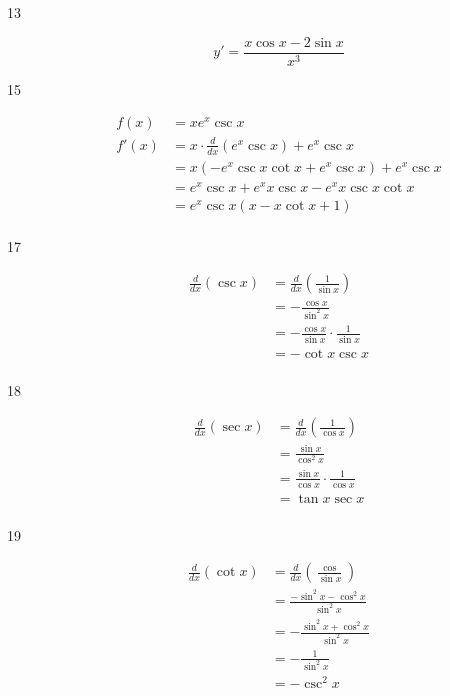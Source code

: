 \documentclass[letterpaper, landscape]{exam}
\begin{document}
\begin{description}
    \item[13] 
      \[
        y' = \boxed{ \frac{x \cos x - 2 \sin x}{x^3} }
      \]

    \item[15] 
      \begin{align*}
        f(x)  & = x e^x \csc x \\
        f'(x) & = x \cdot \frac{d}{dx} \left( e^x \csc x \right) + e^x \csc x \\
              & = x \left( - e^x \csc x \cot x + e^x \csc x  \right)+ e^x \csc x \\
              & = e^x \csc x + e^x x \csc x - e^x x \csc x \cot x \\
              & = \boxed{ e^x \csc x \left( x - x \cot x + 1 \right) } \\
      \end{align*}

    \item[17] 
      \begin{align*}
          \frac{d}{dx} (\csc x) & = \frac{d}{dx} \left( \frac{1}{\sin x} \right) \\
                                & = - \frac{\cos x}{\sin^2 x} \\
                                & = - \frac{\cos x}{\sin x} \cdot \frac{1}{\sin x} \\
                                & = - \cot x \csc x \\
      \end{align*}

    \item[18] 
      \begin{align*}
          \frac{d}{dx} (\sec x) & = \frac{d}{dx} \left( \frac{1}{\cos x} \right) \\
                                & = \frac{\sin x}{\cos^2 x} \\
                                & = \frac{\sin x}{\cos x} \cdot \frac{1}{\cos x} \\
                                & = \tan x \sec x \\
      \end{align*}

    \item[19] 
      \begin{align*}
          \frac{d}{dx} (\cot x) & = \frac{d}{dx} \left( \frac{\cos}{\sin x} \right) \\
                                & = \frac{- \sin^2 x - \cos^2 x}{\sin^2 x} \\
                                & = - \frac{\sin^2 x + \cos^2 x}{\sin^2 x} \\
                                & = - \frac{1}{\sin^2 x} \\
                                & = - \csc^2 x \\
      \end{align*}


\end{description}
\end{document}
